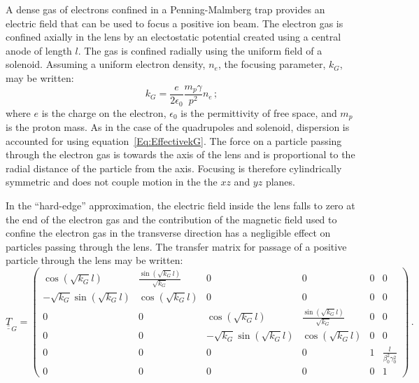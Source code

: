 A dense gas of electrons confined in a Penning-Malmberg trap provides
an electric field that can be used to focus a positive ion beam.
The electron gas is confined axially in the lens by an electostatic
potential created using a central anode of length $l$.
The gas is confined radially using the uniform field of a solenoid.
Assuming a uniform electron density, $n_e$, the focusing parameter,
$k_G$, may be written:
\begin{equation}
  k_G = \frac{e}{2\epsilon_0} \frac{m_p \gamma}{p^2} n_e \,;
            \label{Eq:EffectivekG}
\end{equation}
where $e$ is the charge on the electron, $\epsilon_0$ is the
permittivity of free space, and $m_p$ is the proton mass.
As in the case of the quadrupoles and solenoid, dispersion is
accounted for using equation~\ref{Eq:EffectivekG}.
The force on a particle passing through the electron gas is towards
the axis of the lens and is proportional to the radial distance of the
particle from the axis.
Focusing is therefore cylindrically symmetric and does not couple
motion in the the $xz$ and $yz$ planes.

In the ``hard-edge'' approximation, the electric field inside the
lens falls to zero at the end of the electron gas and the contribution
of the magnetic field used to confine the electron gas in the
transverse direction has a negligible effect on particles passing
through the lens.
The transfer matrix for passage of a positive particle through the
lens may be written: 
\begin{equation}
  \underline{\underline{T}}_{G} =
    \begin{pmatrix}
                    \cos(\sqrt{k_G} l) & \frac{\sin(\sqrt{k_G} l)}{\sqrt{k_G}} &  0 & 0 & 0 & 0 \\
        -\sqrt{k_G} \sin(\sqrt{k_G} l) &                    \cos(\sqrt{k_G} l) &  0 & 0 & 0 & 0 \\
                                     0 &                                     0 &              \cos(\sqrt{k_G} l) & \frac{\sin(\sqrt{k_G} l)}{\sqrt{k_G}}  & 0 & 0 \\
                                     0 &                                     0 &  -\sqrt{k_G} \sin(\sqrt{k_G} l) &                     \cos(\sqrt{k_G} l) & 0 & 0 \\
          0 & 0 & 0 & 0 & 1 & \frac{l}{\beta_0^2 \gamma_0^2} \\
          0 & 0 & 0 & 0 & 0 &                             1
        \end{pmatrix} \, .
\end{equation}

